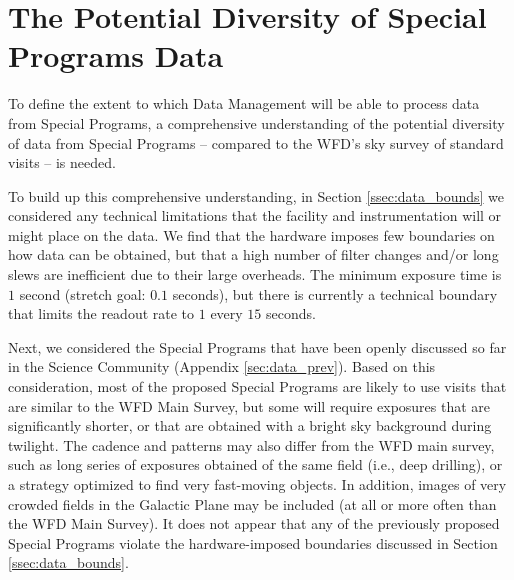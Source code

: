 \documentclass[DM,lsstdoc,toc]{lsstdoc}
\begin{document}



\clearpage
\section{The Potential Diversity of Special Programs Data} \label{sec:data}

To define the extent to which Data Management will be able to process data from Special Programs, a comprehensive understanding of the potential diversity of data from Special Programs -- compared to the WFD's sky survey of standard visits -- is needed. 

To build up this comprehensive understanding, in Section \ref{ssec:data_bounds} we considered any technical limitations that the facility and instrumentation will or might place on the data. We find that the hardware imposes few boundaries on how data can be obtained, but that a high number of filter changes and/or long slews are inefficient due to their large overheads. The minimum exposure time is $1$ second (stretch goal: $0.1$ seconds), but there is currently a technical boundary that limits the readout rate to $1$ every $15$ seconds.

Next, we considered the Special Programs that have been openly discussed so far in the Science Community (Appendix \ref{sec:data_prev}). Based on this consideration, most of the proposed Special Programs are likely to use visits that are similar to the WFD Main Survey, but some will require exposures that are significantly shorter, or that are obtained with a bright sky background during twilight. The cadence and patterns may also differ from the WFD main survey, such as long series of exposures obtained of the same field (i.e., deep drilling), or a strategy optimized to find very fast-moving objects. In addition, images of very crowded fields in the Galactic Plane may be included (at all or more often than the WFD Main Survey). It does not appear that any of the previously proposed Special Programs violate the hardware-imposed boundaries discussed in Section \ref{ssec:data_bounds}.
\end{document}
